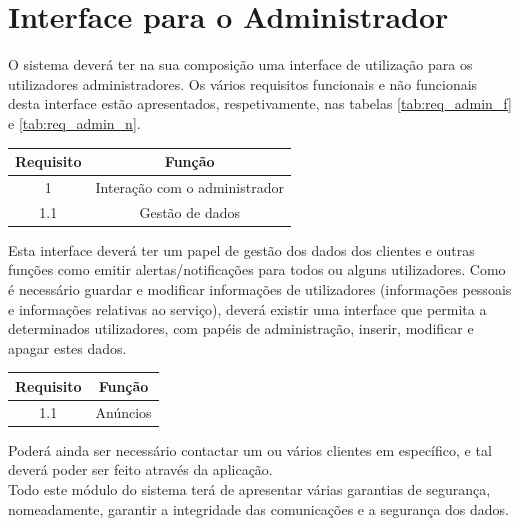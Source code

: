 \section{Interface para o Administrador} \label{sec:req_admin}
O sistema deverá ter na sua composição uma interface de utilização para os utilizadores administradores. Os vários requisitos funcionais e não funcionais desta interface estão apresentados, respetivamente, nas tabelas \ref{tab:req_admin_f} e \ref{tab:req_admin_n}.

\begin{center}
\begin{tabular}[c]{c c} 
\hline
Requisito & Função\\
\hline
1 & Interação com o administrador\\ 

1.1 & Gestão de dados\\

\hline
\end{tabular}
\label{tab:req_admin_f}
\end{center}
\vspace{8mm} %

Esta interface deverá ter um papel de gestão dos dados dos clientes e outras funções como emitir alertas/notificações para todos ou alguns utilizadores. Como é necessário guardar e modificar informações de utilizadores (informações pessoais e informações relativas ao serviço), deverá existir uma interface que permita a determinados utilizadores, com papéis de administração, inserir, modificar e apagar estes dados.

\begin{center}
\begin{tabular}[c]{c c} 
\hline
Requisito & Função\\
\hline
1.1 & Anúncios\\
\hline
\end{tabular}
\label{tab:req_admin_n}
\end{center}

Poderá ainda ser necessário contactar um ou vários clientes em específico, e tal deverá poder ser feito através da aplicação.\\
Todo este módulo do sistema terá de apresentar várias garantias de segurança, nomeadamente, garantir a integridade das comunicações e a segurança dos dados.

